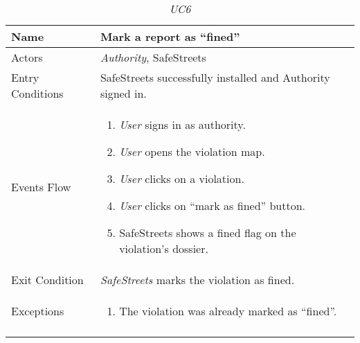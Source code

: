 \documentclass[../../../RASD.tex]{subfiles}
\begin{document}
    \begin{center}
        \begin{longtable}{| p{.35\linewidth} | p{.65\linewidth} |}
            \hline
            \textbf{Name} & \textbf{Mark a report as “fined”}\\ \hline
            Actors & \textit{Authority}, SafeStreets\\ \hline
            Entry Conditions & SafeStreets successfully installed and Authority signed in.\\ \hline
            Events Flow &
            \begin{enumerate}
                \item \textit{User} signs in as authority.
                \item \textit{User} opens the violation map.
                \item \textit{User} clicks on a violation.
                \item \textit{User} clicks on “mark as fined” button.
                \item SafeStreets shows a fined flag on the violation’s dossier.
            \end{enumerate}
            \\ \hline
            Exit Condition & \textit{SafeStreets} marks the violation as fined.\\ \hline
            Exceptions &
            \begin{enumerate}
                \item The violation was already marked as “fined”.
            \end{enumerate}
            \\
            \hline
            \caption[\textit{Use Case 6}]{\textit{UC6}}
        \end{longtable}
    \end{center}
    \newpage
\end{document}
